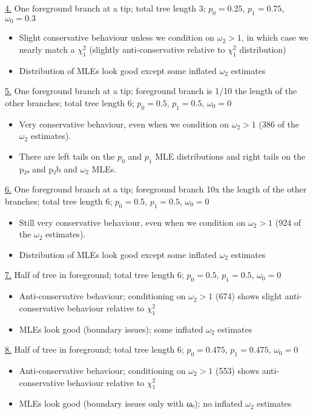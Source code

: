 \documentclass[11pt]{article}
\begin{document}
\href{https://ftfl.ca/misc/bsa/bsa\_sim4\_8-taxon-tree.pdf}{4.} One foreground branch at a tip; total tree length 3; \(p_0=0.25\),
\(p_1=0.75\), \(\omega_0=0.3\)
\begin{itemize}
\item Slight conservative behaviour unless we condition on \(\omega_2>1\), in
which case we nearly match a \(\chi^2_1\) (slightly anti-conservative
relative to \(\chi^2_1\) distribution)
\item Distribution of MLEs look good except some inflated \(\omega_2\) estimates
\end{itemize}

\href{https://ftfl.ca/misc/bsa/bsa\_sim5\_8-taxon-tree.pdf}{5.} One foreground branch at a tip; foreground branch is 1/10 the length of
the other branches; total tree length 6; \(p_0=0.5\), \(p_1=0.5\), \(\omega_0=0\)
\begin{itemize}
\item Very conservative behaviour, even when we condition on \(\omega_2>1\) (386
of the \(\omega_2\) estimates).
\item There are left tails on the \(p_0\) and \(p_1\) MLE distributions and right
tails on the p₂ₐ and p₂b and \(\omega_2\) MLEs.
\end{itemize}

\href{https://ftfl.ca/misc/bsa/bsa\_sim6\_8-taxon-tree.pdf}{6.} One foreground branch at a tip; foreground branch 10x the length of the
other branches; total tree length 6; \(p_0=0.5\), \(p_1=0.5\), \(\omega_0=0\)
\begin{itemize}
\item Still very conservative behaviour, even when we condition on \(\omega_2>1\)
(924 of the \(\omega_2\) estimates).
\item Distribution of MLEs look good except some inflated \(\omega_2\) estimates
\end{itemize}

\href{https://ftfl.ca/misc/bsa/bsa\_sim7\_8-taxon-tree.pdf}{7.} Half of tree in foreground; total tree length 6; \(p_0=0.5\), \(p_1=0.5\),
\(\omega_0=0\)
\begin{itemize}
\item Anti-conservative behaviour; conditioning on \(\omega_2>1\) (674) shows
slight anti-conservative behaviour relative to \(\chi^2_1\)
\item MLEs look good (boundary issues); some inflated \(\omega_2\) estimates
\end{itemize}

\href{https://ftfl.ca/misc/bsa/bsa\_sim8\_8-taxon-tree.pdf}{8.} Half of tree in foreground; total tree length 6; \(p_0=0.475\),
\(p_1=0.475\), \(\omega_0=0\)
\begin{itemize}
\item Anti-conservative behaviour; conditioning on \(\omega_2>1\) (553) shows
anti-conservative behaviour relative to \(\chi^2_1\)
\item MLEs look good (boundary issues only with ωₒ); no inflated \(\omega_2\)
estimates
\end{itemize}
\end{document}
